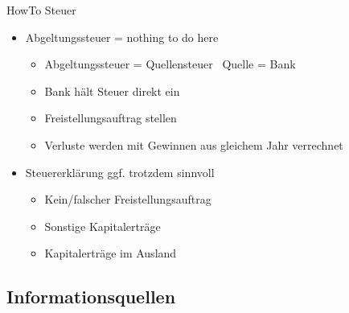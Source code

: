 \documentclass{beamer}
\begin{document}
			\begin{frame}{HowTo Steuer}
				\begin{itemize}
					\item Abgeltungssteuer = nothing to do here
					\begin{itemize}
						\item Abgeltungssteuer = Quellensteuer \textrightarrow\ Quelle = Bank
						\item Bank hält Steuer direkt ein
						\item Freistellungsauftrag stellen
						\item Verluste werden mit Gewinnen aus gleichem Jahr verrechnet
					\end{itemize}\pause
					\item Steuererklärung ggf. trotzdem sinnvoll
					\begin{itemize}
						\item Kein/falscher Freistellungsauftrag
						\item Sonstige Kapitalerträge
						\item Kapitalerträge im Ausland
					\end{itemize}
				\end{itemize}
			\end{frame}
		
		\subsection{Informationsquellen}
			
\end{document}
